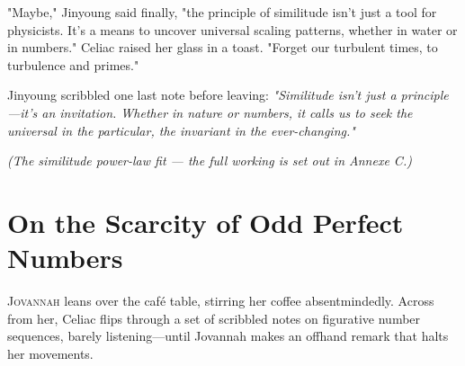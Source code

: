 "Maybe," Jinyoung said finally, "the principle of similitude isn’t just a tool for physicists. It’s a means to uncover universal scaling patterns, whether in water or in numbers." Celiac raised her glass in a toast. "Forget our turbulent times, to turbulence and primes."

Jinyoung scribbled one last note before leaving:
\emph{"Similitude isn’t just a principle—it’s an invitation. Whether in nature or numbers, it calls us to seek the universal in the particular, the invariant in the ever-changing."}

\textit{(The similitude power-law fit --- the full working is set out in Annexe C.)}

% 
% 
% 
\section*{On the Scarcity of Odd Perfect Numbers}

\lettrine{J}{ovannah} leans over the café table, stirring her coffee absentmindedly. Across from her, Celiac flips through a set of scribbled notes on figurative number sequences, barely listening—until Jovannah makes an offhand remark that halts her movements.

